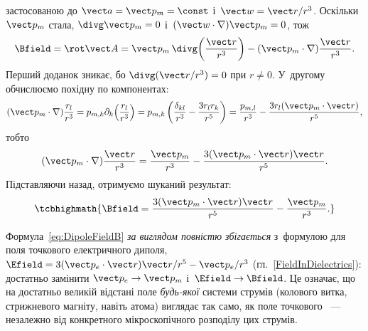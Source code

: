 застосованою до $\vect a=\vect p_m=\const$ і~$\vect w = \vect r/r^3$. Оскільки $\vect p_m$
стала, $\divg\vect p_m=0$ і~$(\vect w\cdot\nabla)\vect p_m=0$, тож
\begin{equation*}
	\Bfield = \rot\vect A = \vect p_m\,\divg\!\left(\frac{\vect r}{r^3}\right) - (\vect p_m\cdot\nabla)\frac{\vect r}{r^3}.
\end{equation*}
Перший доданок зникає, бо $\divg(\vect r/r^3)=0$ при $r\neq0$. У~другому обчислюємо
похідну по компонентах:
\begin{equation*}
	(\vect p_m\cdot\nabla)\frac{r_l}{r^3}
	= p_{m,k}\partial_k\!\left(\frac{r_l}{r^3}\right)
	= p_{m,k}\left(\frac{\delta_{kl}}{r^3} - \frac{3r_l r_k}{r^5}\right)
	= \frac{p_{m,l}}{r^3} - \frac{3r_l(\vect p_m\cdot\vect r)}{r^5},
\end{equation*}
тобто
\begin{equation*}
	(\vect p_m\cdot\nabla)\frac{\vect r}{r^3} = \frac{\vect p_m}{r^3} - \frac{3(\vect p_m\cdot\vect r)\vect r}{r^5}.
\end{equation*}
Підставляючи назад, отримуємо шуканий результат:
\begin{equation}\label{eq:DipoleFieldB}
	\tcbhighmath{
		\Bfield = \frac{3(\vect p_m\cdot\vect r)\vect r}{r^5} - \frac{\vect p_m}{r^3}.
	}
\end{equation}

\begin{Attention}
	Формула~\eqref{eq:DipoleFieldB} \emph{за виглядом повністю збігається} з~формулою для
	поля точкового електричного диполя, $\Efield = 3(\vect p_e\cdot\vect r)\vect r/r^5 -
		\vect p_e/r^3$ (гл.~\ref{FieldInDielectrics}): достатньо замінити $\vect p_e \to \vect
		p_m$ і~$\Efield \to \Bfield$. Це означає, що на достатньо великій відстані поле
	\emph{будь-якої} системи струмів (колового витка, стрижневого магніту, навіть атома)
	виглядає так само, як поле точкового ~--- незалежно від
	конкретного мікроскопічного розподілу цих струмів.
\end{Attention}


